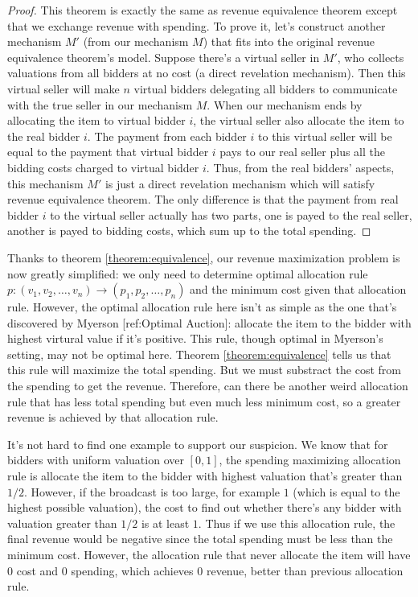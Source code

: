 \begin{proof}
This theorem is exactly the same as revenue equivalence theorem except
that we exchange revenue with spending. To prove it,
let's construct another mechanism $M'$ (from our mechanism $M$) that fits into the original revenue equivalence
theorem's model. Suppose there's a virtual seller in $M'$, who collects valuations from all
bidders at no cost (a direct revelation mechanism). Then this virtual seller will
make $n$ virtual bidders delegating all bidders to communicate with the true seller in our mechanism $M$.
When our mechanism ends by allocating the item to virtual bidder $i$, the virtual seller also
allocate the item to the real bidder $i$. The payment from each bidder $i$ to this
virtual seller will be equal to the payment that virtual bidder $i$ pays to our real seller
plus all the bidding costs charged to virtual bidder $i$. Thus, from the real bidders'
aspects, this mechanism $M'$ is just a direct revelation mechanism which will satisfy
revenue equivalence theorem. The only difference is that the payment from real bidder $i$ to the virtual seller
actually has two parts, one is payed to the real seller, another is payed to bidding costs, which sum
up to the total spending.
\end{proof}

Thanks to theorem \ref{theorem:equivalence}, our revenue maximization problem
is now greatly simplified: we only need to determine optimal allocation rule
$p: (v_1, v_2, \ldots, v_n) \rightarrow (p_1, p_2, \ldots, p_n)$ and the minimum
cost given that allocation rule. However, the optimal allocation rule here
isn't as simple as the one that's discovered by Myerson [ref:Optimal Auction]:
allocate the item to the bidder with highest virtural value if it's positive.
This rule, though optimal in Myerson's setting, may not be optimal here. Theorem
\ref{theorem:equivalence} tells us that this rule will maximize the total spending.
But we must substract the cost from the spending to get the revenue. Therefore,
can there be another weird allocation rule that has less total spending but even
much less minimum cost, so a greater revenue is achieved by that allocation rule.

It's not hard to find one example to support our suspicion. We know that for bidders
with uniform valuation over $[0, 1]$, the spending maximizing allocation rule
is allocate the item to the bidder with highest valuation that's greater than $1/2$.
However, if the broadcast is too large, for example $1$ (which is equal to the
highest possible valuation), the cost to find out whether there's any bidder with valuation
greater than $1/2$ is at least $1$. Thus if we use this allocation rule, the
final revenue would be negative since the total spending must be less than the
minimum cost. However, the allocation rule that never allocate the item will have
$0$ cost and $0$ spending, which achieves $0$ revenue, better than previous allocation
rule.

